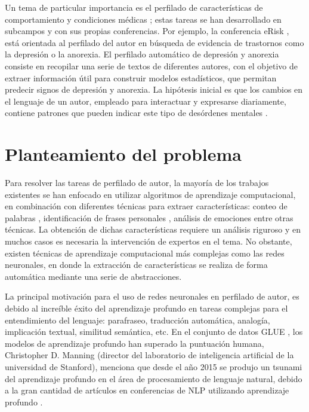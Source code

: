 Un tema de particular importancia es el perfilado de características de comportamiento \citep{kumar2018aggression} y condiciones médicas \citep{de2013predicting}; estas tareas se han desarrollado en subcampos y con sus propias conferencias. Por ejemplo, la conferencia eRisk \citep{Losada2018}, está orientada al perfilado del autor en búsqueda de evidencia de trastornos como la depresión o la anorexia. El perfilado automático de depresión y anorexia consiste en recopilar una serie de textos de diferentes autores, con el objetivo de extraer información útil para construir modelos estadísticos, que permitan predecir signos de depresión y anorexia. La hipótesis inicial es que los cambios en el lenguaje de un autor, empleado para interactuar y expresarse diariamente, contiene patrones que pueden indicar este tipo de desórdenes mentales \cite{de2013predicting}.



\section{Planteamiento del problema}

Para resolver las tareas de perfilado de autor, la mayoría de los trabajos existentes se han enfocado en utilizar algoritmos de aprendizaje computacional, en combinación con diferentes técnicas para extraer características: conteo de palabras \citep{Laserna2014}, identificación de frases personales \citep{Ortega-Mendoza2018}, análisis de emociones \citep{Aragon2019} entre otras técnicas. La obtención de dichas características requiere un análisis riguroso y en muchos casos es necesaria la intervención de expertos en el tema. No obstante, existen técnicas de aprendizaje computacional más complejas como las redes neuronales, en donde la extracción de características se realiza de forma automática mediante una serie de abstracciones.

La principal motivación para el uso de redes neuronales en perfilado de autor, es debido al increíble éxito del aprendizaje profundo en tareas complejas para el entendimiento del lenguaje: parafraseo, traducción automática, analogía, implicación textual, similitud semántica, etc. En el conjunto de datos GLUE \citep{wang2018glue}, los modelos de aprendizaje profundo han superado la puntuación humana, Christopher D. Manning (director del laboratorio de inteligencia artificial de la universidad de Stanford), menciona que desde el año 2015 se produjo un tsunami del aprendizaje profundo en el área de procesamiento de lenguaje natural, debido a la gran cantidad de artículos en conferencias de NLP utilizando aprendizaje profundo \citep{Manning2015}.

